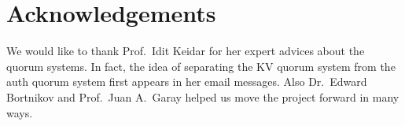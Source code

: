 \section*{Acknowledgements}
We would like to thank Prof.~Idit Keidar for her expert advices about
the quorum systems. In fact, the idea of separating the KV quorum
system from the auth quorum system first appears in her email
messages. Also Dr.~Edward Bortnikov and Prof.~Juan A.~Garay helped us
move the project forward in many ways.
